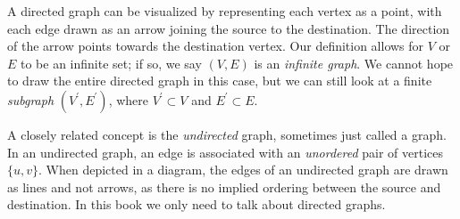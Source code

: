 \documentclass[../generics]{subfiles}
\begin{document}
\begin{figure}
\end{figure}
\noindent
A directed graph can be visualized by representing each vertex as a point, with each edge drawn as an arrow joining the source to the destination. The direction of the arrow points towards the destination vertex. Our definition allows for $V$ or $E$ to be an infinite set; if so, we say $(V, E)$ is an \emph{infinite graph}. We cannot hope to draw the entire directed graph in this case, but we can still look at a finite \emph{subgraph} $(V^\prime, E^\prime)$, where $V^\prime\subset V$ and $E^\prime\subset E$.


\begin{figure}
\end{figure}
A closely related concept is the \emph{undirected} graph, sometimes just called a graph. In an undirected graph, an edge is associated with an \emph{unordered} pair of vertices $\{u,v\}$. When depicted in a diagram, the edges of an undirected graph are drawn as lines and not arrows, as there is no implied ordering between the source and destination. In this book we only need to talk about directed graphs.
\end{document}
